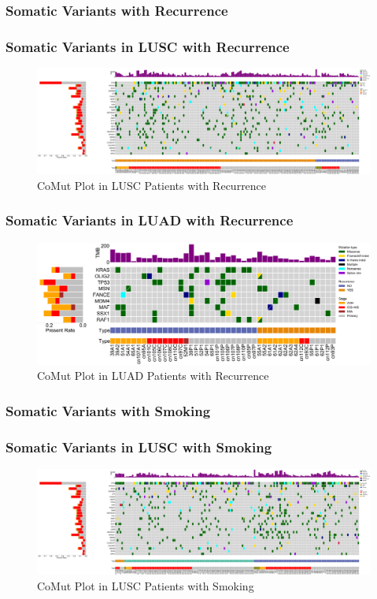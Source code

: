 \documentclass{beamer}
\begin{document}
    \subsubsection{Somatic Variants with Recurrence}
    \begin{frame}
        \frametitle{Somatic Variants in LUSC with Recurrence}

        \begin{figure}
            \includegraphics[width=\linewidth]{figures/Mutect2/BWA-SQC.Recur.pdf}
            \caption{CoMut Plot in LUSC Patients with Recurrence}
        \end{figure}
    \end{frame}

    \begin{frame}
        \frametitle{Somatic Variants in LUAD with Recurrence}

        \begin{figure}
            \includegraphics[width=\linewidth]{figures/Mutect2/BWA-ADC.Recur.pdf}
            \caption{CoMut Plot in LUAD Patients with Recurrence}
        \end{figure}
    \end{frame}

    \subsubsection{Somatic Variants with Smoking}
    \begin{frame}
        \frametitle{Somatic Variants in LUSC with Smoking}

        \begin{figure}
            \includegraphics[width=\linewidth]{figures/Mutect2/BWA-SQC.Smoking.pdf}
            \caption{CoMut Plot in LUSC Patients with Smoking}
        \end{figure}
    \end{frame}
\end{document}
